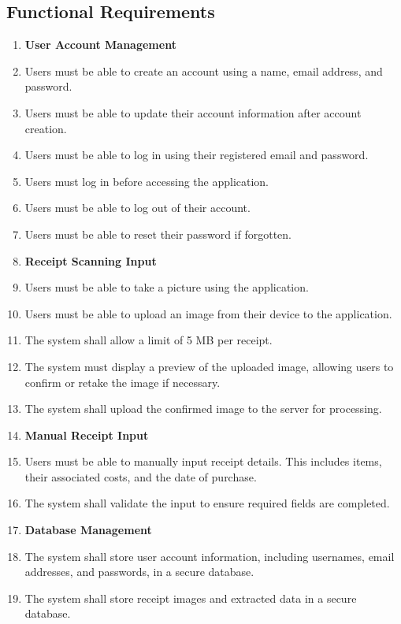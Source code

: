 \documentclass[12pt]{article}
\begin{document}
\subsection{Functional Requirements}
\begin{enumerate}[label=FR\arabic*]
  \item[] \textbf{User Account Management}
  \item Users must be able to create an account using a name, email address, and
  password.
  \item Users must be able to update their account information after account
  creation.
  \item Users must be able to log in using their registered email and password.
  \item Users must log in before accessing the application.
  \item Users must be able to log out of their account.
  \item Users must be able to reset their password if forgotten.

  \item[] \textbf{Receipt Scanning Input}
  \item Users must be able to take a picture using the application.
  \item Users must be able to upload an image from their device to the
  application.
  \item The system shall allow a limit of 5 MB per receipt.
  \item The system must display a preview of the uploaded image, allowing users
  to confirm or retake the image if necessary. 
  \item The system shall upload the confirmed image to the server for processing.
  
  \item[] \textbf{Manual Receipt Input}
  \item Users must be able to manually input receipt details. This includes
  items, their associated costs, and the date of purchase.
  \item The system shall validate the input to ensure required fields are
  completed.
  
  \item[] \textbf{Database Management}
  \item The system shall store user account information, including usernames,
  email addresses, and passwords, in a secure database.
  \item The system shall store receipt images and extracted data in a secure database.


\end{enumerate}
\end{document}
